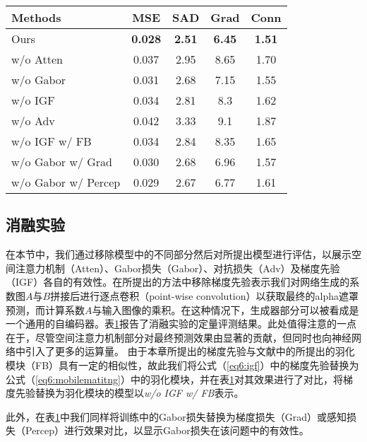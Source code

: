 \begin{table}[t]
	\centering
	\begin{tabular}{lcccc}
		\toprule
		Methods & MSE & SAD & Grad &Conn\\
		\midrule
		Ours & \textbf{0.028} & \textbf{2.51} & \textbf{6.45} & \textbf{1.51}\\    
		w/o Atten & 0.037 & 2.95& 8.65 & 1.70\\
		w/o Gabor & 0.031 & 2.68 & 7.15 & 1.55\\
		w/o IGF & 0.034 & 2.81 & 8.3 & 1.62\\
		w/o Adv & 0.042 & 3.33 & 9.1 & 1.87\\
		w/o IGF w/ FB  & 0.034 & 2.84 & 8.35 & 1.65\\
		w/o Gabor w/ Grad & 0.030 & 2.68 & 6.96 & 1.57\\
		w/o Gabor w/ Percep & 0.029 & 2.67 & 6.77 & 1.61\\
		\bottomrule
	\end{tabular}
	\label{tab6:ablation}
\end{table}
\subsection{消融实验}
在本节中，我们通过移除模型中的不同部分然后对所提出模型进行评估，以展示空间注意力机制（Atten）、Gabor损失（Gabor）、对抗损失（Adv）及梯度先验（IGF）各自的有效性。在所提出的方法中移除梯度先验表示我们对网络生成的系数图$A$与$B$拼接后进行逐点卷积（point-wise convolution）以获取最终的alpha遮罩预测，而计算系数$A$与输入图像的乘积。在这种情况下，生成器部分可以被看成是一个通用的自编码器。表\ref{tab6:ablation}报告了消融实验的定量评测结果。此处值得注意的一点在于，尽管空间注意力机制部分对最终预测效果由显著的贡献，但同时也向神经网络中引入了更多的运算量。
由于本章所提出的梯度先验与文献\parencite{zhu2017fast}中的所提出的羽化模块（FB）具有一定的相似性，故此我们将公式（\ref{eq6:igf}）中的梯度先验替换为公式（\ref{eq6:mobilematitng}）中的羽化模块，并在表\ref{tab6:ablation}对其效果进行了对比，将梯度先验替换为羽化模块的模型以\textit{w/o IGF w/ FB}表示。

此外，在表\ref{tab6:ablation}中我们同样将训练中的Gabor损失替换为梯度损失（Grad）或感知损失（Percep）进行效果对比，以显示Gabor损失在该问题中的有效性。

